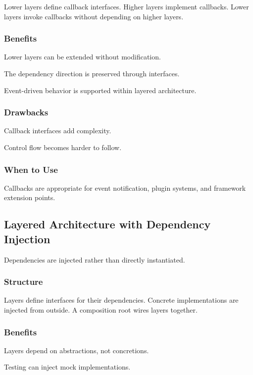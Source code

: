 \documentclass[11pt]{article}
\begin{document}
Lower layers define callback interfaces. Higher layers implement callbacks. Lower layers invoke callbacks without depending on higher layers.

\subsubsection{Benefits}

Lower layers can be extended without modification.

The dependency direction is preserved through interfaces.

Event-driven behavior is supported within layered architecture.

\subsubsection{Drawbacks}

Callback interfaces add complexity.

Control flow becomes harder to follow.

\subsubsection{When to Use}

Callbacks are appropriate for event notification, plugin systems, and framework extension points.

\subsection{Layered Architecture with Dependency Injection}

Dependencies are injected rather than directly instantiated.

\subsubsection{Structure}

Layers define interfaces for their dependencies. Concrete implementations are injected from outside. A composition root wires layers together.

\subsubsection{Benefits}

Layers depend on abstractions, not concretions.

Testing can inject mock implementations.
\end{document}
